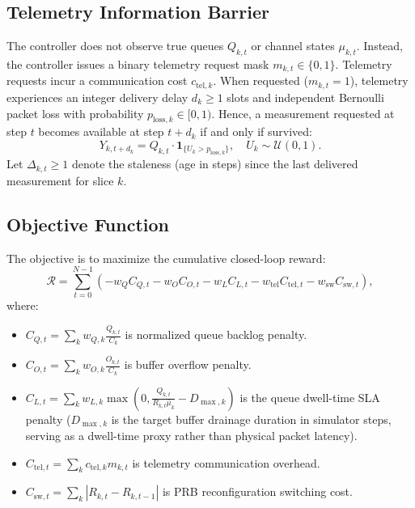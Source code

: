 \documentclass[conference]{IEEEtran}
\begin{document}
\subsection{Telemetry Information Barrier}
The controller does not observe true queues $Q_{k, t}$ or channel states $\mu_{k, t}$. Instead, the controller issues a binary telemetry request mask $m_{k, t} \in \{0, 1\}$. Telemetry requests incur a communication cost $c_{\text{tel}, k}$.
When requested ($m_{k, t} = 1$), telemetry experiences an integer delivery delay $d_k \ge 1$ slots and independent Bernoulli packet loss with probability $p_{\text{loss}, k} \in [0, 1)$. Hence, a measurement requested at step $t$ becomes available at step $t + d_k$ if and only if survived:
\begin{equation}
Y_{k, t+d_k} = Q_{k, t} \cdot \mathbf{1}_{\{U_k > p_{\text{loss}, k}\}}, \quad U_k \sim \mathcal{U}(0, 1).
\end{equation}
Let $\Delta_{k, t} \ge 1$ denote the staleness (age in steps) since the last delivered measurement for slice $k$.

\subsection{Objective Function}
The objective is to maximize the cumulative closed-loop reward:
\begin{equation}
\mathcal{R} = \sum_{t=0}^{N-1} \left( -w_Q C_{Q, t} - w_O C_{O, t} - w_L C_{L, t} - w_{\text{tel}} C_{\text{tel}, t} - w_{\text{sw}} C_{\text{sw}, t} \right),
\end{equation}
where:
\begin{itemize}
    \item $C_{Q, t} = \sum_k w_{Q, k} \frac{Q_{k, t}}{C_k}$ is normalized queue backlog penalty.
    \item $C_{O, t} = \sum_k w_{O, k} \frac{O_{k, t}}{C_k}$ is buffer overflow penalty.
    \item $C_{L, t} = \sum_k w_{L, k} \max\left(0, \frac{Q_{k, t}}{R_{k, t} \bar{\mu}_k} - D_{\max, k}\right)$ is the queue dwell-time SLA penalty ($D_{\max, k}$ is the target buffer drainage duration in simulator steps, serving as a dwell-time proxy rather than physical packet latency).
    \item $C_{\text{tel}, t} = \sum_k c_{\text{tel}, k} m_{k, t}$ is telemetry communication overhead.
    \item $C_{\text{sw}, t} = \sum_k |R_{k, t} - R_{k, t-1}|$ is PRB reconfiguration switching cost.
\end{itemize}
\end{document}
